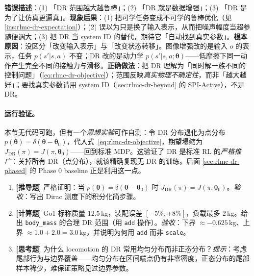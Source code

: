 \begin{pitfall}
\textbf{错误描述}：(1) 「DR 范围越大越鲁棒」；(2) 「DR 就是数据增强」；(3) 「DR 是为了让仿真更逼真」。\textbf{现象后果}：(1) 把可学任务变成不可学的鲁棒优化（见 \cref{ins:rlmc-dr-expectation}）；(2) 误以为只是换了输入表示，从而把噪声幅度当超参随便调大；(3) 把 DR 当 system ID 的替代，期待它「自动找到真实参数」。\textbf{根本原因}：没区分「改变输入表示」与「改变状态转移」。图像增强改的是输入 $o$ 的表示，任务 $p(s'|s,a)$ 不变；DR 改的是动力学 $p(s'|s,a;\boldsymbol\theta)$——低摩擦下同一动作产生完全不同的接触力与滑移。\textbf{正确做法}：把 DR 理解为「同时解一族不同的控制问题」（\cref{eq:rlmc-dr-objective}）；范围反映\emph{真实物理不确定性}，而非「越大越好」；要找真实参数请用 system ID（\cref{sec:rlmc-dr-beyond} 的 SPI-Active），不是 DR。
\end{pitfall}

\paragraph{运行验证。}本节无代码可跑，但有一个\emph{思想实验}可作自测：令 DR 分布退化为点分布 $p(\boldsymbol\theta)=\delta(\boldsymbol\theta-\boldsymbol\theta_0)$，代入式~\eqref{eq:rlmc-dr-objective}，期望塌缩为 $J_{\mathrm{DR}}(\pi)=J(\pi,\boldsymbol\theta_0)$——回到标准 MDP。这验证了 DR 是标准 RL 的\emph{严格推广}：关掉所有 DR（点分布），就该精确复现无 DR 的训练。后面 \cref{sec:rlmc-dr-phased} 的 Phase 0 baseline 正是利用这一点。

\begin{practice}[本节练习]
\begin{enumerate}
  \item \textbf{[推导题]} 严格证明：当 $p(\boldsymbol\theta)=\delta(\boldsymbol\theta-\boldsymbol\theta_0)$ 时 $J_{\mathrm{DR}}(\pi)=J(\pi,\boldsymbol\theta_0)$。\emph{验收}：写出 Dirac 测度下的积分化简步骤。
  \item \textbf{[计算题]} Go1 标称质量 $12.5$\,kg，装配误差 $[-5\%,+8\%]$，负载最多 $2$\,kg。给出 \verb|body_mass| 的合理 DR 范围（用 \verb|add| 操作）。\emph{验收}：下界 $\approx-0.625$\,kg、上界 $\approx 1.0+2.0=3.0$\,kg，并说明为何用 \verb|add| 而非 \verb|scale|。
  \item \textbf{[思考题]} 为什么 locomotion 的 DR 常用均匀分布而非正态分布？\emph{提示}：考虑尾部行为与边界覆盖——均匀分布在区间端点仍有非零密度，正态分布的尾部样本稀少，难保证策略见过边界参数。
\end{enumerate}
\end{practice}

